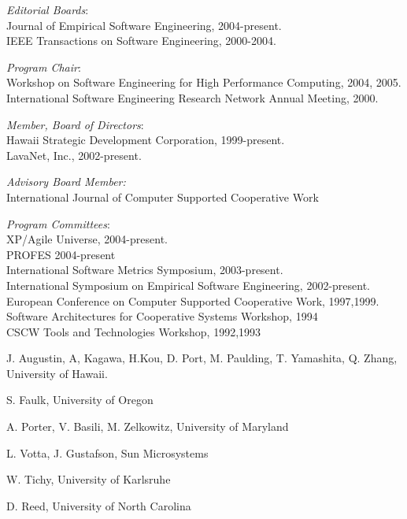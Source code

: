 \documentclass[11pt]{article}
\begin{document}
\begin{Synergistic Activities}
\item {\em Editorial Boards}:\\ 
Journal of Empirical Software Engineering, 2004-present.\\
IEEE Transactions on Software Engineering, 2000-2004.

\item {\em Program Chair}: \\
Workshop on Software Engineering for High Performance Computing, 2004, 2005.\\
International Software Engineering Research Network Annual Meeting, 2000.

\item {\em Member, Board of Directors}:\\
Hawaii Strategic Development Corporation, 1999-present.\\
LavaNet, Inc., 2002-present.

\item {\em Advisory Board Member:}\\ 
  International Journal of Computer Supported Cooperative Work

\item {\em Program Committees}: \\
  XP/Agile Universe, 2004-present.\\
  PROFES 2004-present\\
  International Software Metrics Symposium, 2003-present.\\
  International Symposium on Empirical Software Engineering, 2002-present.\\
  European Conference on Computer Supported Cooperative Work, 1997,1999.\\
  Software Architectures for Cooperative Systems Workshop, 1994 \\
  CSCW Tools and Technologies Workshop, 1992,1993 \\

\end{Synergistic Activities}



\begin{Collaborators}
\item J. Augustin, A, Kagawa, H.Kou, D. Port, M. Paulding, T. Yamashita, Q. Zhang, University of Hawaii.
\item S. Faulk, University of Oregon
\item A. Porter, V. Basili, M. Zelkowitz, University of Maryland
\item L. Votta, J. Gustafson, Sun Microsystems
\item W. Tichy, University of Karlsruhe
\item D. Reed, University of North Carolina
\end{Collaborators}
\end{document}
